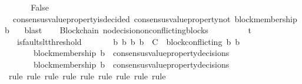\begin{isabellebody}
\ \ \ \isamarkupfalse%
\ \isamarkupfalse%
\ False\isanewline
\ \ \ \ \ \isamarkupfalse%
\ {\isacartoucheopen}{\isasymnot}\ consensus{\isacharunderscore}value{\isacharunderscore}property{\isacharunderscore}is{\isacharunderscore}decided\ {\isacharparenleft}consensus{\isacharunderscore}value{\isacharunderscore}property{\isacharunderscore}not\ {\isacharparenleft}block{\isacharunderscore}membership\ b{}{\isacharparenright}{\isacharcomma}\ {\isasymsigma}{\isacharprime}{\isacharparenright}{\isacartoucheclose}\ \isamarkupfalse%
\ blast\isanewline
\ \isamarkupfalse%
%
\endisatagproof
{\isafoldproof}%
%
\isadelimproof
\isanewline
%
\endisadelimproof
\isanewline
\isanewline
{}\isamarkupfalse%
\ {\isacharparenleft}\ Blockchain{\isacharparenright}\ no{\isacharunderscore}decision{\isacharunderscore}on{\isacharunderscore}conflicting{\isacharunderscore}blocks\ {\isacharcolon}\isanewline
\ \ {\isachardoublequoteopen}{\isasymforall}\ {\isasymsigma}{}\ {\isasymsigma}{}{\isachardot}\ {\isacharbraceleft}{\isasymsigma}{}{\isacharcomma}\ {\isasymsigma}{}{\isacharbraceright}\ {\isasymsubseteq}\ {\isasymSigma}t\isanewline
\ \ {\isasymlongrightarrow}\ is{\isacharunderscore}faults{\isacharunderscore}lt{\isacharunderscore}threshold\ {\isacharparenleft}{\isasymsigma}{}\ {\isasymunion}\ {\isasymsigma}{}{\isacharparenright}\isanewline
\ \ {\isasymlongrightarrow}\ {\isacharparenleft}{\isasymforall}\ b{}\ b{}{\isachardot}\ {\isacharbraceleft}b{}{\isacharcomma}\ b{}{\isacharbraceright}\ {\isasymsubseteq}\ C\ {\isasymand}\ block{\isacharunderscore}conflicting\ {\isacharparenleft}b{}{\isacharcomma}\ b{}{\isacharparenright}\ \isanewline
\ \ \ \ \ \ {\isasymlongrightarrow}\ block{\isacharunderscore}membership\ b{}\ {\isasymin}\ consensus{\isacharunderscore}value{\isacharunderscore}property{\isacharunderscore}decisions\ {\isasymsigma}{}\ \isanewline
\ \ \ \ \ \ {\isasymlongrightarrow}\ block{\isacharunderscore}membership\ b{}\ {\isasymnotin}\ consensus{\isacharunderscore}value{\isacharunderscore}property{\isacharunderscore}decisions\ {\isasymsigma}{}{\isacharparenright}{\isachardoublequoteclose}\isanewline
%
\isadelimproof
\ \ %
\endisadelimproof
%
\isatagproof
{}\isamarkupfalse%
\ {\isacharparenleft}rule{\isacharcomma}\ rule{\isacharcomma}\ rule{\isacharcomma}\ rule{\isacharcomma}\ rule{\isacharcomma}\ rule{\isacharcomma}\ rule{\isacharcomma}\ rule{\isacharcomma}\ rule{\isacharparenright}\isanewline

\end{isabellebody}
